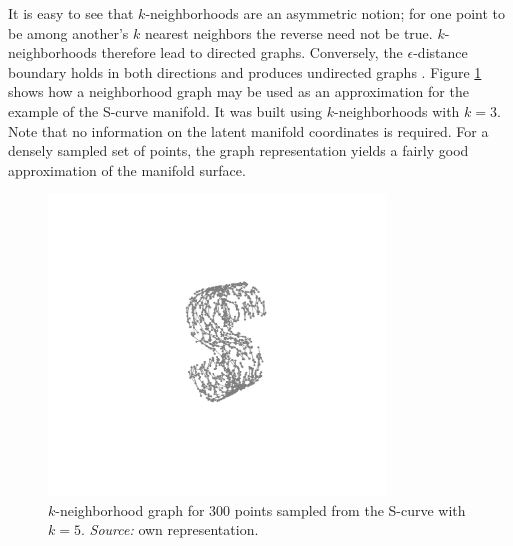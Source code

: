 \begin{minipage}[b]{0.5\textwidth}
  It is easy to see that $k$-neighborhoods are an asymmetric notion; for one 
  point to be among another's $k$ nearest neighbors the reverse need not be 
  true.
  $k$-neighborhoods therefore lead to directed graphs.
  Conversely, the $\epsilon$-distance boundary holds in both directions and 
  produces undirected graphs \citep{heetal2005}.
  Figure \ref{fig-neighbor-graph} shows how a neighborhood graph may be used as 
  an approximation for the example of the S-curve manifold.
  It was built using $k$-neighborhoods with $k = 3$.
  Note that no information on the latent manifold coordinates is required.
  For a densely sampled set of points, the graph representation yields a fairly
  good approximation of the manifold surface.
\end{minipage}
\begin{minipage}[b]{0.05\textwidth}
  \phantom{xxx}
\end{minipage}
\begin{minipage}[b]{0.45\textwidth}
  \begin{figure}[H]
    \centering
    \includegraphics[trim = 250 170 200 140, clip, %
      width = 0.8\textwidth]{figures/s-curve-connected}
    \caption[S-curve neighborhood graph]{$k$-neighborhood graph for 300 points 
    sampled from the S-curve with $k = 5$.
    \textit{Source:} own representation.}
    \label{fig-neighbor-graph}
  \end{figure}
\end{minipage}


